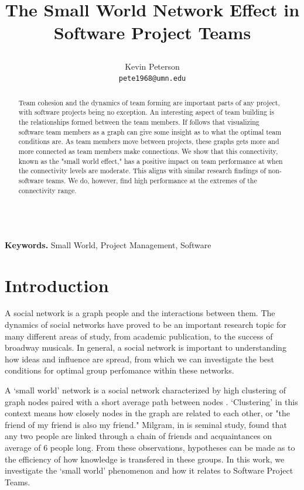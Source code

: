 \documentclass{proc}
\title{
The Small World Network Effect in Software Project Teams
\author{Kevin Peterson\\
\small \texttt{pete1968@umn.edu}
}
}
\begin{document}
\maketitle

\begin{abstract}
Team cohesion and the dynamics of team forming are important parts of any project, with software projects being no exception. An interesting aspect of team building is the relationships formed between the team members. If follows that visualizing software team members as a graph can give some insight as to what the optimal team conditions are. As team members move between projects, these graphs gets more and more connected as team members make connections. We show that this connectivity, known as the "small world effect," has a positive impact on team performance at when the connectivity levels are moderate. This aligns with similar research findings of non-software teams. We do, however, find high performance at the extremes of the connectivity range.
\end{abstract}

\noindent \\\textbf{Keywords.} Small World, Project Management, Software

\section{Introduction}
A social network is a graph people and the interactions between them. The dynamics of social networks have proved to be an important research topic for many different areas of study, from academic publication\cite{barabasi2002evolution}, to the success of broadway musicals\cite{uzzi2005collaboration}. In general, a social network is important to understanding how ideas and influence are spread\cite{kempe2003maximizing}, from which we can investigate the best conditions for optimal group perfomance within these networks.

A `small world' network is a social network characterized by high clustering of graph nodes paired with a short average path between nodes \cite{watts1998collective}. `Clustering' in this context means how closely nodes in the graph are related to each other, or "the friend of my friend is also my friend." Milgram, in is seminal study, found that any two people are linked through a chain of friends and acquaintances on average of 6 people long\cite{milgram1967small}. From these observations, hypotheses can be made as to the efficiency of how knowledge is transfered in these groups\cite{latora2001efficient}. In this work, we investigate the `small world' phenomenon and how it relates to Software Project Teams.
\end{document}
